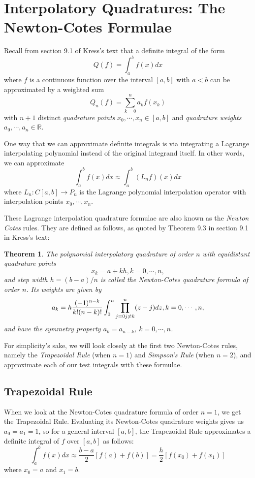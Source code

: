 \documentclass[a4paper,draft]{amsproc}
\theoremstyle{plain}
\newtheorem{thm}{Theorem}[section]
\theoremstyle{definition}
\theoremstyle{remark}
\numberwithin{equation}{section}
\begin{document}
\section{Interpolatory Quadratures: The Newton-Cotes Formulae}
Recall from section 9.1 of Kress's text that a definite integral of the form
\[
Q(f)=\displaystyle\int_{a}^{b}f(x)dx
\]
where $f$ is a continuous function over the interval $[a, b]$ with $a<b$ can be approximated by a weighted sum
\[
Q_n(f)=\displaystyle\sum_{k=0}^{n}a_kf(x_k)
\]
with $n+1$ distinct \emph{quadrature points} $x_0, \cdots, x_n\in [a, b]$ and \emph{quadrature weights} $a_0, \cdots, a_n\in\mathbb{R}$.

One way that we can approximate definite integrals is via integrating a Lagrange interpolating polynomial instead of the original integrand itself. In other words, we can approximate
\[
\displaystyle\int_{a}^{b}f(x)dx\approx\int_{a}^{b}(L_nf)(x)dx
\]
where $L_n: C[a, b]\rightarrow P_n$ is the Lagrange polynomial interpolation operator with interpolation points $x_0, \cdots, x_n$. 

These Lagrange interpolation quadrature formulae are also known as the \emph{Newton Cotes} rules. They are defined as follows, as quoted by Theorem 9.3 in section 9.1 in Kress's text:

\begin{thm}
The polynomial interpolatory quadrature of order $n$ with equidistant quadrature points
\[
x_k=a+kh, k=0, \cdots, n,
\]
and step width $h=(b-a)/n$ is called the \emph{Newton-Cotes quadrature formula} of order $n$. Its weights are given by
\[
a_k=h\displaystyle\frac{(-1)^{n-k}}{k!(n-k)!}\int_{0}^{n}\prod_{j=0 \\ j\neq k}^{n}(z-j)dz, k=0, \cdots, n,
\]
and have the symmetry property $a_k=a_{n-k}$, $k=0, \cdots, n$.
\end{thm}

For simplicity's sake, we will look closely at the first two Newton-Cotes rules, namely the \emph{Trapezoidal Rule} (when $n=1$) and \emph{Simpson's Rule} (when $n=2$), and approximate each of our test integrals with these formulae.

\subsection{Trapezoidal Rule}

When we look at the Newton-Cotes quadrature formula of order $n=1$, we get the Trapezoidal Rule. Evaluating its Newton-Cotes quadrature weights gives us $a_0=a_1=1$, so for a general interval $[a, b]$, the Trapezoidal Rule approximates a definite integral of $f$ over $[a, b]$ as follows:
\[
\displaystyle\int_{a}^{b}f(x)dx\approx\frac{b-a}{2}[f(a)+f(b)]=\frac{h}{2}[f(x_0)+f(x_1)]
\]
where $x_0=a$ and $x_1=b$.
\end{document}
